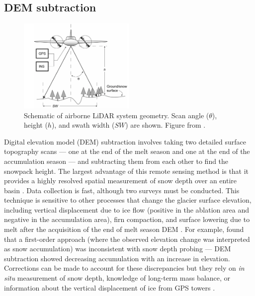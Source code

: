 \documentclass{sfuthesis}
\begin{document}
\subsection{DEM subtraction}
\begin{figure}
 \centering
      \includegraphics[width=0.5\textwidth]{lidar.png}
  \caption{Schematic of airborne LiDAR system geometry. Scan angle ($\theta$), height ($h$), and swath width ($SW$) are shown. Figure from \cite{Deems2006}.}
        \label{lidar}
\end{figure}

Digital elevation model (DEM) subtraction involves taking two detailed surface topography scans --- one at the end of the melt season and one at the end of the accumulation season --- and subtracting them from each other to find the snowpack height. The largest advantage of this remote sensing method is that it provides a highly resolved spatial measurement of snow depth over an entire basin \citep{Deems2006, Sold2013}. Data collection is fast, although two surveys must be conducted. This technique is sensitive to other processes that change the glacier surface elevation, including vertical displacement due to ice flow (positive in the ablation area and negative in the accumulation area), firn compaction, and surface lowering due to melt after the acquisition of the end of melt season DEM \citep{Sold2013}. For example, \citep{Sold2013} found that a first-order approach (where the observed elevation change was interpreted as snow accumulation) was inconsistent with snow depth probing --- DEM subtraction showed decreasing accumulation with an increase in elevation. Corrections can be made to account for these discrepancies but they rely on \textit{in situ} measurement of snow depth, knowledge of long-term mass balance, or information about the vertical displacement of ice from GPS towers \citep{Sold2013}. 
\end{document}
